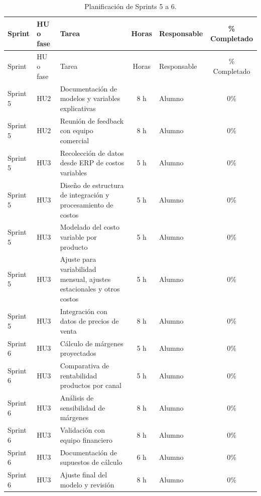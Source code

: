 \documentclass[
11pt, %
]{charter}
\begin{document}
\begin{table}[htpb]
\centering
\caption{Planificación de Sprints 5 a 6.}
\begin{tabularx}{\linewidth}{@{}|l|l|X|c|l|c|@{}}
\hline
\rowcolor[HTML]{C0C0C0}
Sprint & HU o fase & Tarea & Horas & Responsable & \% Completado \\ \hline
Sprint & HU o fase & Tarea & Horas & Responsable & \% Completado \\ \hline
Sprint 5 & HU2 & Documentación de modelos y variables explicativas & 8 h & Alumno & 0\% \\ \hline
Sprint 5 & HU2 & Reunión de feedback con equipo comercial & 8 h & Alumno & 0\% \\ \hline
Sprint 5 & HU3 & Recolección de datos desde ERP de costos variables & 5 h & Alumno & 0\% \\ \hline
Sprint 5 & HU3 & Diseño de estructura de integración y procesamiento de costos & 5 h & Alumno & 0\% \\ \hline
Sprint 5 & HU3 & Modelado del costo variable por producto & 5 h & Alumno & 0\% \\ \hline
Sprint 5 & HU3 & Ajuste para variabilidad mensual, ajustes estacionales y otros costos & 5 h & Alumno & 0\% \\ \hline
Sprint 5 & HU3 & Integración con datos de precios de venta & 8 h & Alumno & 0\% \\ \hline
\hline
Sprint 6 & HU3 & Cálculo de márgenes proyectados & 5 h & Alumno & 0\% \\ \hline
Sprint 6 & HU3 & Comparativa de rentabilidad productos por canal & 5 h & Alumno & 0\% \\ \hline
Sprint 6 & HU3 & Análisis de sensibilidad de márgenes & 8 h & Alumno & 0\% \\ \hline
Sprint 6 & HU3 & Validación con equipo financiero & 8 h & Alumno & 0\% \\ \hline
Sprint 6 & HU3 & Documentación de supuestos de cálculo & 6 h & Alumno & 0\% \\ \hline
Sprint 6 & HU3 & Ajuste final del modelo y revisión & 8 h & Alumno & 0\% \\ \hline
\end{tabularx}
\end{table}
\end{document}
